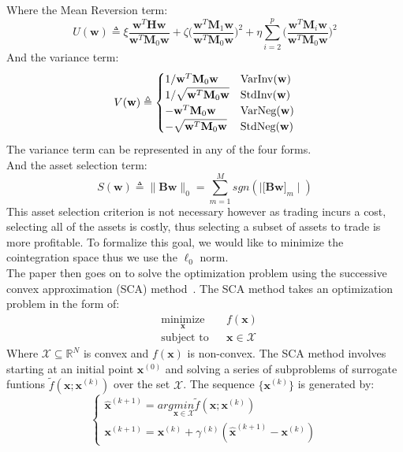 \noindent Where the Mean Reversion term: $$U(\mathbf{w}) \triangleq \xi \frac{\mathbf{w}^T \mathbf{H}\mathbf{w}}{\mathbf{w}^T \mathbf{M}_0\mathbf{w}} + \zeta \biggl( \frac{\mathbf{w}^T \mathbf{M}_1\mathbf{w}}{\mathbf{w}^T \mathbf{M}_0\mathbf{w}} \biggr) ^2 + \eta \sum_{i=2}^{p} \biggl( \frac{\mathbf{w}^T \mathbf{M}_i\mathbf{w}}{\mathbf{w}^T \mathbf{M}_0\mathbf{w}}\biggr)^2$$ And the variance term: $$V(\mathbf{w}) \triangleq \begin{cases}
        1/\mathbf{w}^T \mathbf{M}_0\mathbf{w}        & \text{VarInv(\textbf{w})} \\
        1/\sqrt{\mathbf{w}^T \mathbf{M}_0\mathbf{w}} & \text{StdInv(\textbf{w})} \\
        -\mathbf{w}^T \mathbf{M}_0\mathbf{w}         & \text{VarNeg(\textbf{w})} \\
        -\sqrt{\mathbf{w}^T \mathbf{M}_0\mathbf{w}}  & \text{StdNeg(\textbf{w})}
    \end{cases}$$
The variance term can be represented in any of the four forms.
\\[5mm]
And the asset selection term: $$S(\mathbf{w}) \triangleq \big\| \mathbf{B} \mathbf{w}\big\|_0 = \sum_{m=1}^{M} sgn(\mid \bigl[ \mathbf{B} \mathbf{w} \bigr]_m \mid)$$ This asset selection criterion is not necessary however as trading incurs a cost, selecting all of the assets is costly, thus selecting a subset of assets to trade is more profitable. To formalize this goal, we would like to minimize the cointegration space thus we use the $\ell_0$ norm.
\\[5mm]
The paper then goes on to solve the optimization problem using the successive convex approximation (SCA) method~\cite{scaOptimization}. The SCA method takes an optimization problem in the form of:
\begin{equation*}
    \begin{aligned}
         & \underset{\mathbf{x}}{\text{minimize}}
         &                                        & f(\mathbf{x})              \\
         & \text{subject to}
         &                                        & \mathbf{x} \in \mathcal{X}
    \end{aligned}
\end{equation*}
\noindent Where $\mathcal{X} \subseteq \mathbb{R}^N$ is convex and $f(\mathbf{x})$ is non-convex. The SCA method involves starting at an initial point $\mathbf{x}^{(0)}$ and solving a series of subproblems of surrogate funtions $\tilde{f}(\mathbf{x}; \mathbf{x}^{(k)})$ over the set $\mathcal{X}$. The sequence $\bigl\{ \mathbf{x}^{(k)} \bigr\}$ is generated by: $$\begin{cases}
        \hat{\mathbf{x}}^{(k+1)} = arg \underset{\mathbf{x} \in \mathcal{X}}{min} \tilde{f}(\mathbf{x}; \mathbf{x}^{(k)}) \\
        \mathbf{x}^{(k+1)} = \mathbf{x}^{(k)} + \gamma^{(k)}(\hat{\mathbf{x}}^{(k+1)} - \mathbf{x}^{(k)})
    \end{cases}$$
